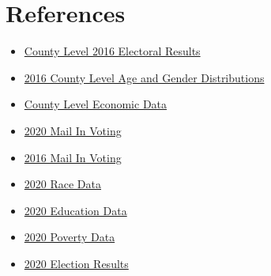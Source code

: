 \documentclass[letterpaper, twocolumn]{article}
\begin{document}
\section{References}

\begin{itemize}
  \item \href{https://public.opendatasoft.com/explore/dataset/usa-2016-presidential-election-by-county/table/?disjunctive.stat}{County Level 2016 Electoral Results}
  \item \href{https://www.census.gov/data/tables/time-series/demo/popest/2010s-counties-detail.html}{2016 County Level Age and Gender Distributions}
  \item \href{https://apps.bea.gov/iTable/index_regional.cfm}{County Level Economic Data} 
  \item \href{https://electproject.github.io/Early-Vote-2020G/index.html}{2020 Mail In Voting}
  \item \href{http://www.electproject.org/home}{2016 Mail In Voting}
  \item \href{https://rb.gy/kte2f5}{2020 Race Data}
  \item \href{https://rb.gy/1pcgmq}{2020 Education Data}
  \item \href{https://rb.gy/zwscb1}{2020 Poverty Data}
  \item \href{https://www.kaggle.com/etsc9287/2020-general-election-polls}{2020 Election Results}
  
  
\end{itemize}
\pagebreak
\end{document}
